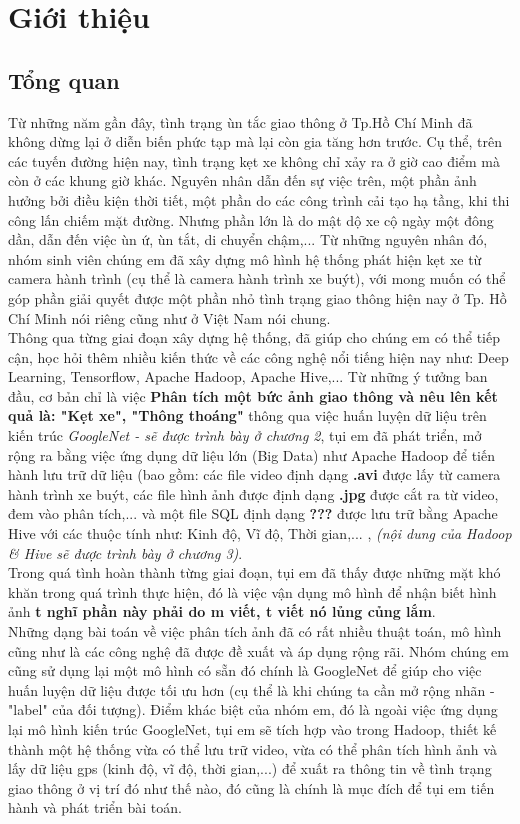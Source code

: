 \chapter{Giới thiệu}

\section{Tổng quan}
	 Từ những năm gần đây, tình trạng ùn tắc giao thông ở Tp.Hồ Chí Minh đã không dừng lại ở diễn biến phức tạp mà lại còn gia tăng hơn trước. Cụ thể, trên các tuyến đường hiện nay, tình trạng kẹt xe không chỉ xảy ra ở giờ cao điểm mà còn ở các khung giờ khác. Nguyên nhân dẫn đến sự việc trên, một phần ảnh hưởng bởi điều kiện thời tiết, một phần do các công trình cải tạo hạ tầng, khi thi công lấn chiếm mặt đường. Nhưng phần lớn là do mật dộ xe cộ ngày một đông dần, dẫn đến việc ùn ứ, ùn tắt, di chuyển chậm,... Từ những nguyên nhân đó, nhóm sinh viên chúng em đã xây dựng mô hình hệ thống phát hiện kẹt xe từ camera hành trình (cụ thể là camera hành trình xe buýt), với mong muốn có thể góp phần giải quyết được một phần nhỏ tình trạng giao thông hiện nay ở Tp. Hồ Chí Minh nói riêng cũng như ở Việt Nam nói chung. \\
	 Thông qua từng giai đoạn xây dựng hệ thống, đã giúp cho chúng em có thể tiếp cận, học hỏi thêm nhiều kiến thức về các công nghệ nổi tiếng hiện nay như: Deep Learning, Tensorflow, Apache Hadoop, Apache Hive,... Từ những ý tưởng ban đầu, cơ bản chỉ là việc \textbf{Phân tích một bức ảnh giao thông và nêu lên kết quả là: "Kẹt xe", "Thông thoáng"} thông qua việc huấn luyện dữ liệu trên kiến trúc \textsl{GoogleNet - sẽ được trình bày ở chương 2}, tụi em đã phát triển, mở rộng ra bằng việc ứng dụng dữ liệu lớn (Big Data) như Apache Hadoop để tiến hành lưu trữ dữ liệu (bao gồm: các file video định dạng \textbf{.avi} được lấy từ camera hành trình xe buýt, các file hình ảnh được định dạng \textbf{.jpg} được cắt ra từ video, đem vào phân tích,... và một file SQL định dạng \textbf{???} được lưu trữ bằng Apache Hive với các thuộc tính như: Kinh độ, Vĩ độ, Thời gian,... , \textsl{(nội dung của Hadoop \& Hive sẽ được trình bày ở chương 3)}.  \\
	 Trong quá tình hoàn thành từng giai đoạn, tụi em đã thấy được những mặt khó khăn trong quá trình thực hiện, đó là việc vận dụng mô hình để nhận biết hình ảnh \textbf{t nghĩ phần này phải do m viết, t viết nó lủng củng lắm}. \\
	 Những dạng bài toán về việc phân tích ảnh đã có rất nhiều thuật toán, mô hình cũng như là các công nghệ đã được đề xuất và áp dụng rộng rãi. Nhóm chúng em cũng sử dụng lại một mô hình có sẵn đó chính là GoogleNet để giúp cho việc huấn luyện dữ liệu được tối ưu hơn (cụ thể là khi chúng ta cần mở rộng nhãn - "label" của đối tượng). Điểm khác biệt của nhóm em, đó là ngoài việc ứng dụng lại mô hình kiến trúc GoogleNet, tụi em sẽ tích hợp vào trong Hadoop, thiết kế thành một hệ thống vừa có thể lưu trữ video, vừa có thể phân tích hình ảnh và lấy dữ liệu gps (kinh độ, vĩ độ, thời gian,...) để xuất ra thông tin về tình trạng giao thông ở vị trí đó như thế nào, đó cũng là chính là mục đích để tụi em tiến hành và phát triển bài toán.\\

